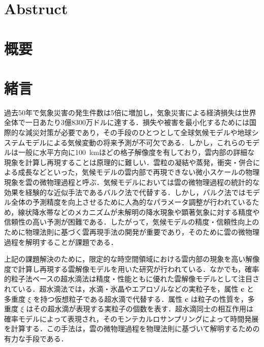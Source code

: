 \section*{Abstruct}
\newpage
\section*{概要}

\newpage
\tableofcontents
\newpage
\section{緒言}
過去50年で気象災害の発生件数は5倍に増加し，気象災害による経済損失は世界全体で一日あたり3億8300万ドルに達する\cite{wmo2021}．損失や被害を最小化するためには国際的な減災対策が必要であり，その手段のひとつとして全球気候モデル\cite{climatemodel}や地球システムモデル\cite{earthsystem}による気候変動の将来予測が不可欠である．しかし，これらのモデルは一般に水平方向に\SI{100}{\km}ほどの格子解像度を有しており，雲内部の詳細な現象を計算し再現することは原理的に難しい\cite{grabowski2019}．雲粒の凝結や蒸発，衝突・併合による成長などといった，気候モデルの雲内部で再現できない微小スケールの物理現象を雲の微物理過程と呼ぶ．気候モデルにおいては雲の微物理過程の統計的な効果を経験的な近似手法であるバルク法で代替する\cite{kessler1969,lin1983,rutledge1984}．しかし，バルク法ではモデル全体の予測精度を向上させるために人為的なパラメータ調整が行われている\cite{hourdin2017}ため，線状降水帯などのメカニズムが未解明の降水現象や顕著気象に対する精度や信頼性の高い予測が困難である．したがって，気候モデルの精度・信頼性向上のために物理法則に基づく雲再現手法の開発が重要であり，そのために雲の微物理過程を解明することが課題である．

上記の課題解決のために，限定的な時空間領域における雲内部の現象を高い解像度で計算し再現する雲解像モデルを用いた研究が行われている\cite{khain2015,grabowski2019,morrison2020}．なかでも，確率的粒子法ベースの超水滴法\cite{shima2009,shima2020}は精度・性能ともに優れた雲解像モデルとして注目されている．超水滴法では，水滴・氷晶やエアロゾルなどの実粒子を，属性 $\bm{c}$ と多重度 $\xi$ を持つ仮想粒子である超水滴で代替する．属性 $\bm{c}$ は粒子の性質を，多重度 $\xi$ はその超水滴が表現する実粒子の個数を表す．超水滴同士の相互作用は確率モデルによって表現され，そのモンテカルロサンプリングによって時間発展を計算する．この手法は，雲の微物理過程を物理法則に基づいて解明するための有力な手段である．


